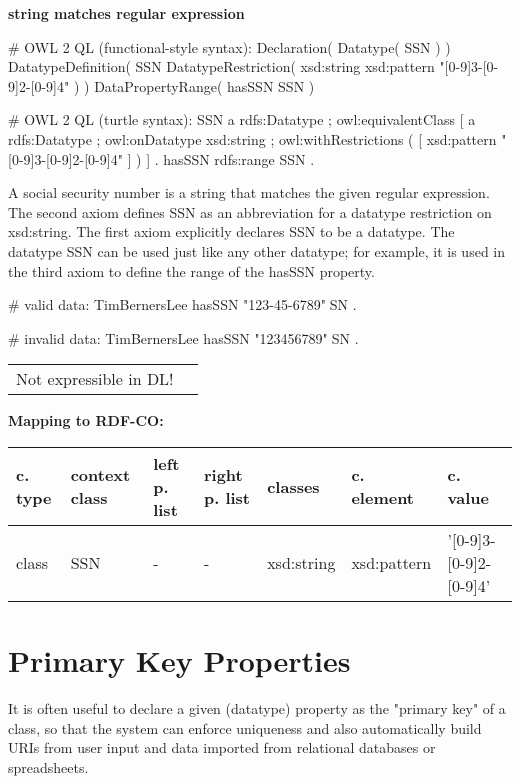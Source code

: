 \documentclass{llncs}
\newenvironment{gcotable}{
  \scriptsize
  \sffamily
  \vspace{0cm}
	\begin{center}
	\textbf{\vspace{0.4cm}Mapping to RDF-CO:} \\
  \begin{tabular}{l|l|l|l|l|l|l}
	\hline
  \textbf{c. type} & \textbf{context class} & \textbf{left p. list} & \textbf{right p. list} & \textbf{classes} & \textbf{c. element} & \textbf{c. value} \\
  \hline

}{
  \hline
  \end{tabular}
	\end{center}
}
\newenvironment{DL}{
  \vspace{0cm}
	\begin{center}
  \begin{tabular}{r l}

}{
  \end{tabular}
	\end{center}
}
\begin{document}
\textbf{string matches regular expression}

\begin{ex}
# OWL 2 QL (functional-style syntax):
Declaration( Datatype( SSN ) ) 
DatatypeDefinition( 
    SSN
    DatatypeRestriction( xsd:string xsd:pattern "[0-9]{3}-[0-9]{2}-[0-9]{4}" ) )     
DataPropertyRange( hasSSN SSN ) 
\end{ex}

\begin{ex}
# OWL 2 QL (turtle syntax):
SSN 
    a rdfs:Datatype ;
    owl:equivalentClass [
        a rdfs:Datatype ;
        owl:onDatatype xsd:string ;
        owl:withRestrictions ( 
            [ xsd:pattern "[0-9]{3}-[0-9]{2}-[0-9]{4}" ] ) ] .
hasSSN rdfs:range SSN .
\end{ex}

A social security number is a string that matches the given regular expression. 
The second axiom defines SSN as an abbreviation for a datatype restriction on xsd:string. 
The first axiom explicitly declares SSN to be a datatype. 
The datatype SSN can be used just like any other datatype; 
for example, it is used in the third axiom to define the range of the hasSSN property. 

\begin{ex}
# valid data:
TimBernersLee
    hasSSN "123-45-6789"^^SSN .
\end{ex}

\begin{ex}
# invalid data:
TimBernersLee
    hasSSN "123456789"^^SSN .
\end{ex}

\begin{DL}
Not expressible in DL!
\end{DL}

\begin{gcotable}
class & SSN & - & - & xsd:string & xsd:pattern & '[0-9]{3}-[0-9]{2}-[0-9]{4}' \\
\end{gcotable}

\section{Primary Key Properties}

It is often useful to declare a given (datatype) property as the "primary key" of a class, so that the system can enforce uniqueness and also automatically build URIs from user input and data imported from relational databases or spreadsheets. 
\end{document}
